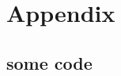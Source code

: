 \chapter{Appendix}
\label{sec:appendix}


\section{some code} \label{appendix:some-code}
    \inputminted[firstline=5, lastline=30]{python}{./../physics-code/computation-scripts/script.py}
    
